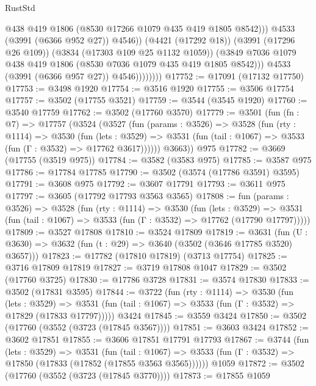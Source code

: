 \begin{lexlean}{RustStd}
\begin{coremodule}
                              @438
                              @419
                              @1806
                              (@8530 @17266 @1079 @435 @419 @1805 @8542)))
                          @4533
                          (@3991 (@6366 @952 @27))
                          @4546))
                      (@4421 (@17292 @18))
                      (@3991 (@17296 @26 @109))
                      (@3834 (@17303 @109 @25 @1132 @1059))
                      (@3849 @7036 @1079 @438 @419 @1806 (@8530 @7036 @1079 @435 @419 @1805 @8542)))
                    @4533
                    (@3991 (@6366 @957 @27))
                    @4546))))))))
@17752 := @17091 (@17132 @17750)
@17753 := @3498 @1920
@17754 := @3516 @1920
@17755 := @3506 @17754
@17757 := @3502 (@17755 @3521)
@17759 := @3544 (@3545 @1920)
@17760 := @3540 @17759
@17762 := @3502 (@17760 @3570)
@17779 := @3501
    (fun (fn : @7) =>
    @17757
      (@3524
        (@3527
          (fun (params : @3526) =>
          @3528
            (fun (rty : @1114) =>
            @3530
              (fun (lets : @3529) =>
              @3531 (fun (tail : @1067) => @3533 (fun (Γ : @3532) => @17762 @3617))))))
        @3663))
    @975
@17782 := @3669 (@17755 (@3519 @975))
@17784 := @3582 (@3583 @975)
@17785 := @3587 @975
@17786 := @17784 @17785
@17790 := @3502 (@3574 (@17786 @3591) @3595)
@17791 := @3608 @975
@17792 := @3607 @17791
@17793 := @3611 @975
@17797 := @3605 (@17792 @17793 @3563 @3565)
@17808 := fun (params : @3526) =>
  @3528
    (fun (rty : @1114) =>
    @3530
      (fun (lets : @3529) =>
      @3531 (fun (tail : @1067) => @3533 (fun (Γ : @3532) => @17762 (@17790 @17797)))))
@17809 := @3527 @17808
@17810 := @3524 @17809
@17819 := @3631
    (fun (U : @3630) => @3632 (fun (t : @29) => @3640 (@3502 (@3646 @17785 @3520) @3657)))
@17823 := @17782 (@17810 @17819) (@3713 @17754)
@17825 := @3716 @17809 @17819
@17827 := @3719 @17808 @1047
@17829 := @3502 (@17760 @3725)
@17830 := @17786 @3728
@17831 := @3574 @17830
@17833 := @3502 (@17831 @3595)
@17844 := @3722
    (fun (rty : @1114) =>
    @3530
      (fun (lets : @3529) =>
      @3531 (fun (tail : @1067) => @3533 (fun (Γ : @3532) => @17829 (@17833 @17797)))))
    @3424
@17845 := @3559 @3424
@17850 := @3502 (@17760 (@3552 (@3723 (@17845 @3567))))
@17851 := @3603 @3424
@17852 := @3602 @17851
@17855 := @3606 @17851 @17791 @17793
@17867 := @3744
    (fun (lets : @3529) =>
    @3531
      (fun (tail : @1067) =>
      @3533 (fun (Γ : @3532) => @17850 (@17833 (@17852 (@17855 @3563 @3565))))))
    @1059
@17872 := @3502 (@17760 (@3552 (@3723 (@17845 @3770))))
@17873 := @17855 @1059

\end{coremodule}
\end{lexlean}
